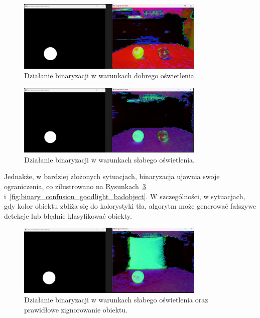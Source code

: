 \documentclass[a4paper,twoside,12pt]{book}
\begin{document}
\begin{figure}[h]
    \centering
    \includegraphics[width=0.8\textwidth]{Images/Porownanie/Binaryzacja/Zrzut ekranu 2025-01-02 194021.png}
    \caption{Działanie binaryzacji w warunkach dobrego oświetlenia.}
    \label{fig:binary_confusion_goodlight}
\end{figure}

\begin{figure}[h]
    \centering
    \includegraphics[width=0.8\textwidth]{Images/Porownanie/Binaryzacja/Zrzut ekranu 2025-01-02 194004.png}
    \caption{Działanie binaryzacji w warunkach słabego oświetlenia.}
    \label{fig:binary_confusion_badlight}
\end{figure}

\newpage

Jednakże, w bardziej złożonych sytuacjach, binaryzacja ujawnia swoje ograniczenia, co zilustrowano na Rysunkach~\ref{fig:binary_confusion_badlight_goodobject} i~\ref{fig:binary_confusion_goodlight_badobject}. W szczególności, w sytuacjach, gdy kolor obiektu zbliża się do kolorystyki tła, algorytm może generować fałszywe detekcje lub błędnie klasyfikować obiekty.


\begin{figure}[h]
    \centering
    \includegraphics[width=0.8\textwidth]{Images/Porownanie/Binaryzacja/Zrzut ekranu 2025-01-02 193840.png}
    \caption{Działanie binaryzacji w warunkach słabego oświetlenia oraz prawidłowe zignorowanie obiektu.}
    \label{fig:binary_confusion_badlight_goodobject}
\end{figure}
\end{document}
